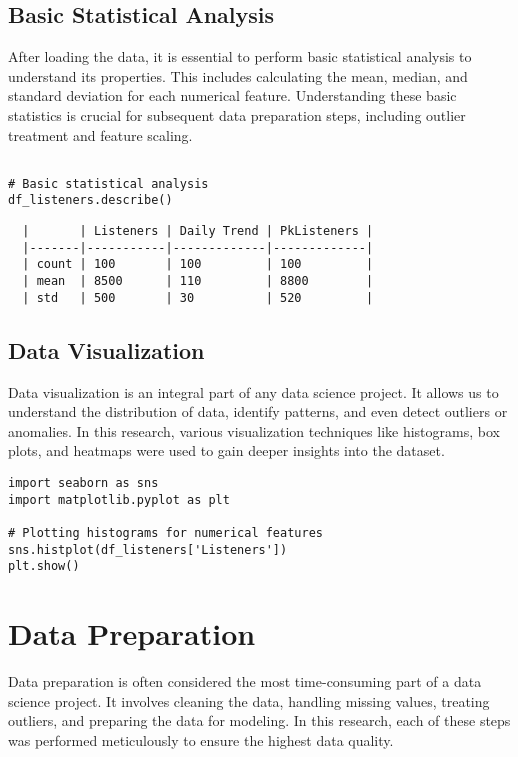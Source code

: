 \documentclass[12pt]{article}
\begin{document}
\newpage

\subsection{Basic Statistical Analysis}

After loading the data, it is essential to perform basic statistical analysis to understand its properties. This includes calculating the mean, median, and standard deviation for each numerical feature. Understanding these basic statistics is crucial for subsequent data preparation steps, including outlier treatment and feature scaling.

\begin{lstlisting}

# Basic statistical analysis
df_listeners.describe()
\end{lstlisting}
\begin{verbatim}
  |       | Listeners | Daily Trend | PkListeners |
  |-------|-----------|-------------|-------------|
  | count | 100       | 100         | 100         |
  | mean  | 8500      | 110         | 8800        |
  | std   | 500       | 30          | 520         |
\end{verbatim}



\subsection{Data Visualization}

Data visualization is an integral part of any data science project. It allows us to understand the distribution of data, identify patterns, and even detect outliers or anomalies. In this research, various visualization techniques like histograms, box plots, and heatmaps were used to gain deeper insights into the dataset.

\begin{lstlisting}
import seaborn as sns
import matplotlib.pyplot as plt

# Plotting histograms for numerical features
sns.histplot(df_listeners['Listeners'])
plt.show()
\end{lstlisting}

\newpage

\section{Data Preparation}

Data preparation is often considered the most time-consuming part of a data science project. It involves cleaning the data, handling missing values, treating outliers, and preparing the data for modeling. In this research, each of these steps was performed meticulously to ensure the highest data quality.
\end{document}
